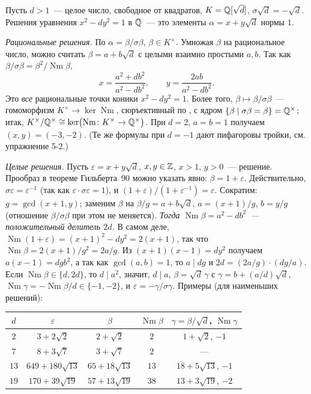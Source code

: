 \begin{example}
Пусть $d>1$~--- целое число, свободное от квадратов, $K=\mathbb Q[\sqrt d]$, $\sigma\sqrt d=-\sqrt d$. Решения уравнения
$x^2-dy^2=1$ в $\mathbb Q$~--- это элементы $\alpha=x+y\sqrt d$ нормы $1$.

\emph{Рациональные решения.} По  $\alpha=\beta/\sigma\beta$, $\beta\in K^\times$. Умножая $\beta$ на
рациональное число, можно считать $\beta=a+b\sqrt d$ с целыми взаимно простыми $a,b$. Так как
$\beta/\sigma\beta=\beta^2/\operatorname{Nm}\beta$,
\[
x=\frac{a^2+db^2}{a^2-db^2},\qquad y=\frac{2ab}{a^2-db^2}.
\]
Это \emph{все} рациональные точки коники $x^2-dy^2=1$. Более того, $\beta\mapsto\beta/\sigma\beta$~--- гомоморфизм
$K^\times\to\ker\operatorname{Nm}$, сюръективный по , с ядром $\{\beta\mid\sigma\beta=\beta\}=\mathbb Q^\times$; итак,
$K^\times/\mathbb Q^\times\cong\ker\bigl(\operatorname{Nm}\colon K^\times\to\mathbb Q^\times\bigr)$. При $d=2$, $a=b=1$ получаем
$(x,y)=(-3,-2)$. (Те же формулы при $d=-1$ дают пифагоровы тройки, см. упражнение 5-2.)

\emph{Целые решения.} Пусть $\varepsilon=x+y\sqrt d$, $x,y\in\mathbb Z$, $x>1$, $y>0$~--- решение. Прообраз в теореме
Гильберта~90 можно указать явно: $\beta=1+\varepsilon$. Действительно, $\sigma\varepsilon=\varepsilon^{-1}$ (так как
$\varepsilon\cdot\sigma\varepsilon=1$), и $(1+\varepsilon)/(1+\varepsilon^{-1})=\varepsilon$. Сократим: $g=\gcd(x+1,y)$;
заменим $\beta$ на $\beta/g=a+b\sqrt d$, $a=(x+1)/g$, $b=y/g$ (отношение $\beta/\sigma\beta$ при этом не меняется).
\emph{Тогда $\operatorname{Nm}\beta=a^2-db^2$~--- положительный делитель $2d$.} В самом
деле, $\operatorname{Nm}(1+\varepsilon)=(x+1)^2-dy^2=2(x+1)$, так что $\operatorname{Nm}\beta=2(x+1)/g^2=2a/g$. Из $(x+1)(x-1)=dy^2$
получаем $a(x-1)=dgb^2$, а так как $\gcd(a,b)=1$, то $a\mid dg$ и $2d=(2a/g)\cdot(dg/a)$. Если $\operatorname{Nm}\beta\in\{d,2d\}$,
то $d\mid a^2$, значит, $d\mid a$, $\beta=\sqrt d\,\gamma$ с $\gamma=b+(a/d)\sqrt d$, $\operatorname{Nm}\gamma=-\operatorname{Nm}\beta/d\in\{-1,-2\}$, и
$\varepsilon=-\gamma/\sigma\gamma$. Примеры (для наименьших решений):
\begin{center}
\begin{tabular}{ccccc}
\toprule
$d$ & $\varepsilon$ & $\beta$ & $\operatorname{Nm}\beta$ & $\gamma=\beta/\sqrt d$, $\operatorname{Nm}\gamma$ \\
\midrule
$2$ & $3+2\sqrt2$ & $2+\sqrt2$ & $2$ & $1+\sqrt2$, $-1$\\
$7$ & $8+3\sqrt7$ & $3+\sqrt7$ & $2$ & ---\\
$13$ & $649+180\sqrt{13}$ & $65+18\sqrt{13}$ & $13$ & $18+5\sqrt{13}$, $-1$\\
$19$ & $170+39\sqrt{19}$ & $57+13\sqrt{19}$ & $38$ & $13+3\sqrt{19}$, $-2$\\
\bottomrule
\end{tabular}
\end{center}


\end{example}
